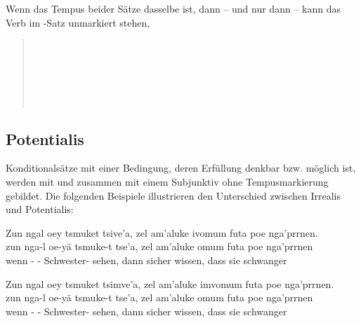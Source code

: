 \noindent Wenn das Tempus beider Sätze dasselbe ist, dann -- und nur dann -- kann das Verb im -Satz unmarkiert stehen,

\begin{quotation}
	\noindent{}\\
	\indent{}\\
	\noindent{}\\
	\indent{}\\
	\noindent{}\\
	\indent{}
\end{quotation}

\subsection{Potentialis} 
Konditionalsätze mit einer Bedingung, deren Erfüllung denkbar bzw. möglich ist, werden mit   und   zusammen mit einem Subjunktiv ohne Tempusmarkierung gebildet. Die folgenden Beispiele illustrieren den Unterschied zwischen Irrealis und Potentialis:

{\small
	\begin{interlin}\label{hyp:ex01}\small
		\glll Zun ngal oey tsmuket tsive'a, zel am'aluke ivomum futa poe nga'prrnen.\\
		zun nga-l oe-yä tsmuke-t tse'a, zel am'aluke omum futa poe nga'prrnen \\
		wenn - - Schwester- sehen, dann sicher wissen, dass sie schwanger\\
		 \Ipawl{}
	\end{interlin}
	
	\begin{interlin}\label{hyp:ex02}\small
		\glll Zun ngal oey tsmuket tsimve'a, zel am'aluke imvomum futa poe nga'prrnen.\\
		zun nga-l oe-yä tsmuke-t tse'a, zel am'aluke omum futa poe nga'prrnen \\
		wenn - - Schwester- sehen, dann sicher wissen, dass sie schwanger\\
		 \Ipawl{}
\end{interlin}}

